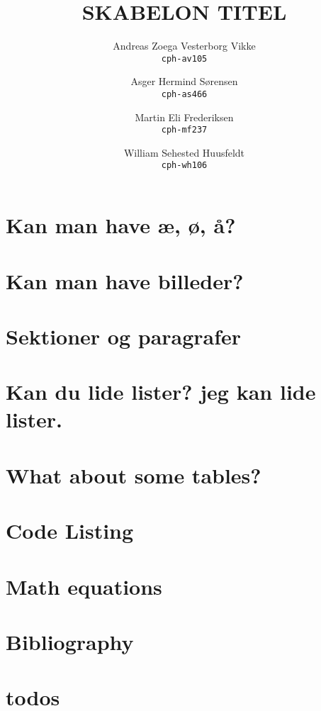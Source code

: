\documentclass{report}
\title{SKABELON TITEL}
\author{
    Andreas Zoega Vesterborg Vikke\\
    \texttt{cph-av105}
    \and
    
    Asger Hermind Sørensen\\
    \texttt{cph-as466}
    \and

    Martin Eli Frederiksen\\
    \texttt{cph-mf237}
    \and

    William Sehested Huusfeldt\\
    \texttt{cph-wh106}
}
\date{}
\begin{document}
    \maketitle
    \tableofcontents
    
    \chapter{Kan man have æ, ø, å?}
     

    \chapter{Kan man have billeder?}
     

    \chapter{Sektioner og paragrafer}
    

    \chapter{Kan du lide lister? jeg kan lide lister.}
    
    
    \chapter{What about some tables?}
    
    
    \chapter{Code Listing}
    

    \chapter{Math equations}
    
    
    \chapter{Bibliography}
    

    \chapter{todos}
    
    
    
\end{document}
